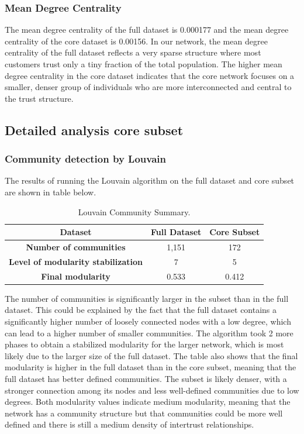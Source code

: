 \documentclass[conference]{IEEEtran}
\begin{document}
\subsubsection{Mean Degree Centrality}
The mean degree centrality of the full dataset is 0.000177 and the mean degree  centrality of the core dataset is 0.00156. In our network, the mean degree centrality of the full dataset reflects a very sparse structure where most customers trust only a tiny fraction of the total population. The higher mean degree centrality in the core dataset indicates that the core network focuses on a smaller, denser group of individuals who are more interconnected and central to the trust structure.

\subsection{Detailed analysis core subset}
\subsubsection{Community detection by Louvain}
The results of running the Louvain algorithm on the full dataset and core subset are shown in table below. 

\begin{table}[h!]
\centering
\begin{tabular}{|c|c|c|}
\toprule
\textbf{Dataset} & \textbf{Full Dataset} & \textbf{Core Subset}\\
\midrule
\textbf{Number of communities} & 1,151 &  172 \\
\textbf{Level of modularity stabilization} & 7 & 5 \\
\textbf{Final modularity} & 0.533 & 0.412 \\
\bottomrule
\end{tabular}
\caption{Louvain Community Summary.}
\label{tab:louvain_community}
\end{table}

The number of communities is significantly larger in the subset than in the full dataset. This could be explained by the fact that the full dataset contains a significantly higher number of loosely connected nodes with a low degree, which can lead to a higher number of smaller communities. The algorithm took 2 more phases to obtain a stabilized modularity for the larger network, which is most likely due to the larger size of the full dataset. The table also shows that the final modularity is higher in the full dataset than in the core subset, meaning that the full dataset has better defined communities. The subset is likely denser, with a stronger connection among its nodes and less well-defined communities due to low degrees. Both modularity values indicate medium modularity, meaning that the network has a community structure but that communities could be more well defined and there is still a medium density of intertrust relationships.
 
\end{document}
